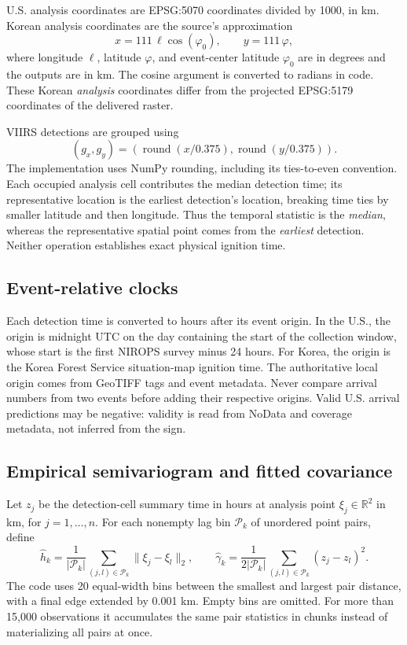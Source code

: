 \documentclass[11pt,a4paper]{article}
\newcommand{\R}{\mathbb{R}}
\begin{document}
U.S. analysis coordinates are EPSG:5070 coordinates divided by 1000, in km.
Korean analysis coordinates are the source's approximation
\begin{equation}
x=111\,\ell\cos(\varphi_0),\qquad y=111\,\varphi,
\end{equation}
where longitude $\ell$, latitude $\varphi$, and event-center latitude
$\varphi_0$ are in degrees and the outputs are in km. The cosine argument is
converted to radians in code. These Korean \emph{analysis} coordinates differ
from the projected EPSG:5179 coordinates of the delivered raster.

VIIRS detections are grouped using
\begin{equation}
(g_x,g_y)=\left(\operatorname{round}(x/0.375),
                     \operatorname{round}(y/0.375)\right).
\end{equation}
The implementation uses NumPy rounding, including its ties-to-even convention.
Each occupied analysis cell contributes the median detection time; its
representative location is the earliest detection's location, breaking time
ties by smaller latitude and then longitude. Thus the temporal statistic is
the \emph{median}, whereas the representative spatial point comes from the
\emph{earliest} detection. Neither operation establishes exact physical
ignition time.

\subsection{Event-relative clocks}
Each detection time is converted to hours after its event origin. In the U.S.,
the origin is midnight UTC on the day containing the start of the collection
window, whose start is the first NIROPS survey minus 24 hours. For Korea,
the origin is the Korea Forest Service situation-map ignition time.
The authoritative local origin comes from GeoTIFF tags and event metadata.
Never compare arrival numbers from two events before adding their respective
origins. Valid U.S. arrival predictions may be negative: validity is read from
NoData and coverage metadata, not inferred from the sign.

\subsection{Empirical semivariogram and fitted covariance}
Let $z_j$ be the detection-cell summary time in hours at analysis point
$\xi_j\in\R^2$ in km, for $j=1,\ldots,n$. For each nonempty lag bin
$\mathcal P_k$ of unordered point pairs, define
\begin{equation}
\widehat h_k=\frac1{|\mathcal P_k|}\sum_{(j,l)\in\mathcal P_k}
\|\xi_j-\xi_l\|_2,\qquad
\widehat\gamma_k=\frac1{2|\mathcal P_k|}
\sum_{(j,l)\in\mathcal P_k}(z_j-z_l)^2.
\end{equation}
The code uses 20 equal-width bins between the smallest and largest pair
distance, with a final edge extended by 0.001 km. Empty bins are omitted.
For more than 15,000 observations it accumulates the same pair statistics in
chunks instead of materializing all pairs at once.
\end{document}
